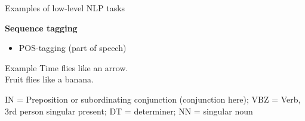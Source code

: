 
\begin{vbframe}{Examples of low-level NLP tasks}


\textbf{Sequence tagging}

\begin{itemize}
	\item POS-tagging (part of speech)
\end{itemize}

\begin{exampleblock}{Example}
		Time flies  like   an   arrow.		\\ Fruit\POS{NN}   flies   like   a   banana.
\end{exampleblock}

\begin{footnotesize}
IN = Preposition or subordinating conjunction (conjunction here); VBZ = Verb, 3rd person singular present; DT = determiner; NN = singular noun
\end{footnotesize}

\vfill

\end{vbframe}



%
%
%

%
%
